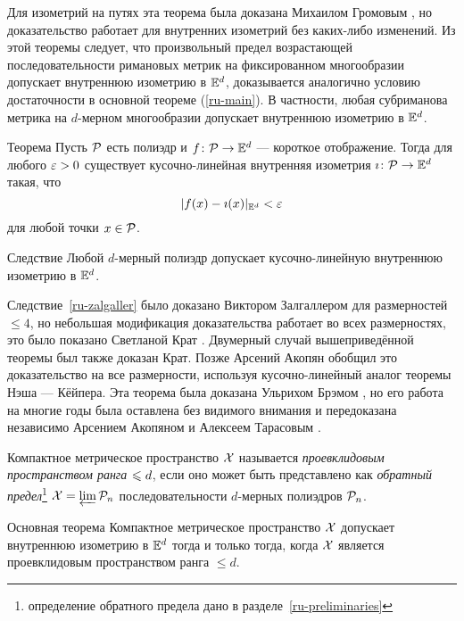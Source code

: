 \documentclass[oneside,a4paper]{article}
\begin{document}
Для изометрий на путях эта теорема была доказана Михаилом Громовым \cite[2.4.11]{gromov-PDE},
но доказательство работает для внутренних изометрий  без каких-либо изменений.
Из этой теоремы следует, что произвольный предел возрастающей последовательности римановых метрик на фиксированном многообразии допускает внутреннюю изометрию в $\mathbb{E}^d$,
доказывается аналогично условию достаточности в основной теореме (\ref{ru-main}).
В частности, любая субриманова метрика на $d$-мерном многообразии допускает внутреннюю изометрию в $\mathbb{E}^d$.

\begin{thm}{Теорема}\label{ru-PL-Nash}
Пусть $\mathcal{P}$ есть полиэдр и $f\colon \mathcal{P}\to\mathbb{E}^d$ --- короткое отображение.
Тогда для любого $\varepsilon>0$ существует кусочно-линейная внутренняя изометрия $\imath\colon \mathcal{P}\to \mathbb{E}^d$ 
такая, что
$$|f(x)-\imath(x)|_{\mathbb{E}^d}<\varepsilon$$
для любой точки $x\in \mathcal{P}$.
\end{thm}

\begin{thm}{Следствие}\label{ru-zalgaller}
Любой $d$-мерный полиэдр допускает кусочно-линейную внутреннюю изометрию в $\mathbb{E}^d$.
\end{thm}

Следствие~\ref{ru-zalgaller} было доказано Виктором Залгаллером \cite{ru-zalgaller} для размерностей $\le 4$, 
но небольшая модификация доказательства работает во всех размерностях,
это было показано Светланой Крат \cite{ru-krat}.
Двумерный случай вышеприведённой теоремы был также доказан Крат.
Позже Арсений Акопян \cite{ru-akopjan} обобщил это доказательство на все размерности,
используя кусочно-линейный аналог теоремы Нэша --- Кёйпера.
Эта теорема была доказана Ульрихом Брэмом \cite{ru-brehm},
но его работа на многие годы была оставлена без видимого внимания
и передоказана независимо Арсением Акопяном и Алексеем Тарасовым \cite{ru-akopjan-tarasov}.





Компактное метрическое пространство $\mathcal{X}$ 
называется \emph{проевклидовым пространством ранга $\z\le d$},
если оно может быть представлено как  \emph{обратный предел}\footnote{определение обратного предела дано в  разделе~\ref{ru-preliminaries}} $\mathcal{X}=\varprojlim \mathcal{P}_n$ 
последовательности $d$-мерных полиэдров $\mathcal{P}_n$.

\begin{thm}{Основная теорема}\label{ru-main}
Компактное метрическое пространство $\mathcal{X}$ 
допускает внутреннюю изометрию в $\mathbb{E}^d$ тогда и только тогда, когда $\mathcal{X}$ является проевклидовым пространством  ранга $\le d$. 
\end{thm}
\end{document}
